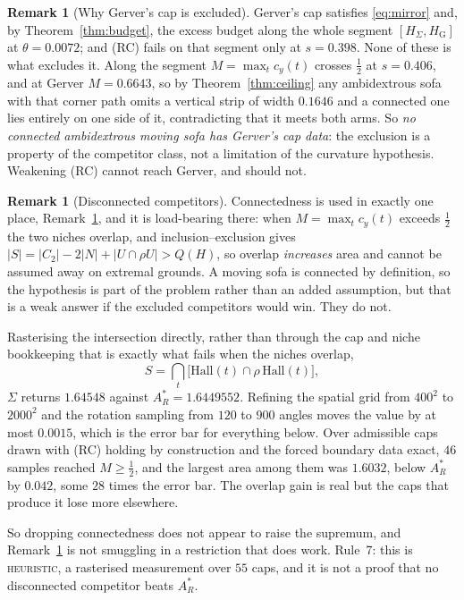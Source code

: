 \documentclass[11pt]{article}
\theoremstyle{definition}
\newtheorem{remark}[theorem]{Remark}
\newcommand{\Sig}{\Sigma}
\begin{document}
\begin{remark}[Why Gerver's cap is excluded]\label{rem:gerverout}
Gerver's cap satisfies \eqref{eq:mirror} and, by Theorem~\ref{thm:budget}, the excess
budget along the whole segment $[H_\Sig,H_{\mathrm G}]$ at $\theta=0.0072$; and (RC) fails
on that segment only at $s=0.398$. None of these is what excludes it. Along the segment
$M=\max_tc_y(t)$ crosses $\tfrac12$ at $s=0.406$, and at Gerver $M=0.6643$, so by
Theorem~\ref{thm:ceiling} any ambidextrous sofa with that corner path omits a vertical
strip of width $0.1646$ and a connected one lies entirely on one side of it, contradicting
that it meets both arms. So \emph{no connected ambidextrous moving sofa has Gerver's cap
data}: the exclusion is a property of the competitor class, not a limitation of the
curvature hypothesis. Weakening (RC) cannot reach Gerver, and should not.
\end{remark}

\begin{remark}[Disconnected competitors]\label{rem:disconn}
Connectedness is used in exactly one place, Remark~\ref{rem:gerverout}, and it is
load-bearing there: when $M=\max_tc_y(t)$ exceeds $\tfrac12$ the two niches overlap, and
inclusion--exclusion gives $|S|=|C_2|-2|N|+|U\cap\rho U|>Q(H)$, so overlap \emph{increases}
area and cannot be assumed away on extremal grounds. A moving sofa is connected by
definition, so the hypothesis is part of the problem rather than an added assumption, but
that is a weak answer if the excluded competitors would win. They do not.

Rasterising the intersection directly, rather than through the cap and niche bookkeeping
that is exactly what fails when the niches overlap,
\[
  S=\bigcap_t\bigl[\mathrm{Hall}(t)\cap\rho\,\mathrm{Hall}(t)\bigr] ,
\]
$\Sig$ returns $1.64548$ against $A_R^\ast=1.6449552$. Refining the spatial grid from
$400^2$ to $2000^2$ and the rotation sampling from $120$ to $900$ angles moves the value by
at most $0.0015$, which is the error bar for everything below. Over admissible caps drawn
with (RC) holding by construction and the forced boundary data exact, $46$ samples reached
$M\ge\tfrac12$, and the largest area among them was $1.6032$, below $A_R^\ast$ by $0.042$,
some $28$ times the error bar. The overlap gain is real but the caps that produce it lose
more elsewhere.

So dropping connectedness does not appear to raise the supremum, and
Remark~\ref{rem:gerverout} is not smuggling in a restriction that does work. Rule~7: this
is \textsc{heuristic}, a rasterised measurement over $55$ caps, and it is not a proof that
no disconnected competitor beats $A_R^\ast$.
\end{remark}
\end{document}

